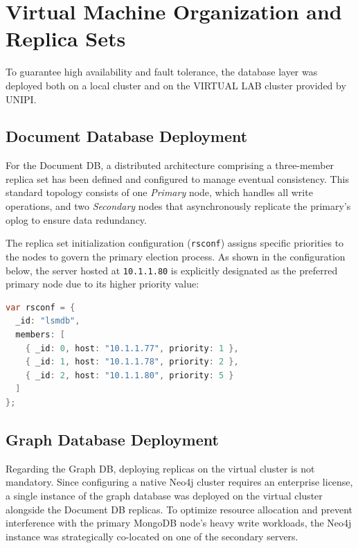 \section{Virtual Machine Organization and Replica Sets}
To guarantee high availability and fault tolerance, the database layer was deployed both on a local cluster and on the VIRTUAL LAB cluster provided by UNIPI.

\subsection{Document Database Deployment}
For the Document DB, a distributed architecture comprising a three-member replica set has been defined and configured to manage eventual consistency. This standard topology consists of one \textit{Primary} node, which handles all write operations, and two \textit{Secondary} nodes that asynchronously replicate the primary's oplog to ensure data redundancy.

The replica set initialization configuration (\texttt{rsconf}) assigns specific priorities to the nodes to govern the primary election process. As shown in the configuration below, the server hosted at \texttt{10.1.1.80} is explicitly designated as the preferred primary node due to its higher priority value:

\begin{lstlisting}[language=java, caption={MongoDB Replica Set Configuration (\texttt{rsconf})}]
var rsconf = {
  _id: "lsmdb",
  members: [
    { _id: 0, host: "10.1.1.77", priority: 1 },
    { _id: 1, host: "10.1.1.78", priority: 2 },
    { _id: 2, host: "10.1.1.80", priority: 5 }
  ]
};
\end{lstlisting}

\subsection{Graph Database Deployment}
Regarding the Graph DB, deploying replicas on the virtual cluster is not mandatory. Since configuring a native Neo4j cluster requires an enterprise license, a single instance of the graph database was deployed on the virtual cluster alongside the Document DB replicas. To optimize resource allocation and prevent interference with the primary MongoDB node's heavy write workloads, the Neo4j instance was strategically co-located on one of the secondary servers.

\vspace{0.5cm}

